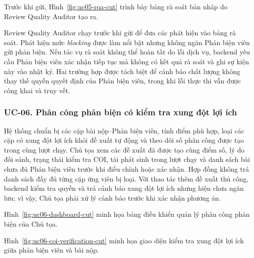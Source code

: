 Trước khi gửi, Hình~\ref{fig:uc05-rqa-cut} trình bày bảng rà soát bản nháp do Review Quality Auditor tạo ra.

Review Quality Auditor chạy trước khi gửi để đưa các phát hiện vào bảng rà soát. Phát hiện mức \textit{blocking} được làm nổi bật nhưng không ngăn Phản biện viên gửi phản biện. Nếu tác vụ rà soát không thể hoàn tất do lỗi dịch vụ, backend yêu cầu Phản biện viên xác nhận tiếp tục mà không có kết quả rà soát và ghi sự kiện này vào nhật ký. Hai trường hợp được tách biệt để cảnh báo chất lượng không thay thế quyền quyết định của Phản biện viên, trong khi lỗi thực thi vẫn được công khai và truy vết.

\subsubsection{UC-06. Phân công phản biện có kiểm tra xung đột lợi ích}

Hệ thống chuẩn bị các cặp bài nộp--Phản biện viên, tính điểm phù hợp, loại các cặp có xung đột lợi ích khỏi đề xuất tự động và theo dõi số phân công được tạo trong cùng lượt chạy. Chủ tọa xem các đề xuất đã được tạo cùng điểm số, lý do đối sánh, trạng thái kiểm tra COI, tải phát sinh trong lượt chạy và danh sách bài chưa đủ Phản biện viên trước khi điều chỉnh hoặc xác nhận. Hợp đồng  không trả danh sách đầy đủ từng cặp ứng viên bị loại. Với thao tác thêm đề xuất thủ công, backend kiểm tra quyền và trả cảnh báo xung đột lợi ích nhưng hiện chưa ngăn lưu; vì vậy, Chủ tọa phải xử lý cảnh báo trước khi xác nhận phương án.


Hình~\ref{fig:uc06-dashboard-cut} minh họa bảng điều khiển quản lý phân công phản biện của Chủ tọa.


Hình~\ref{fig:uc06-coi-verification-cut} minh họa giao diện kiểm tra xung đột lợi ích giữa phản biện viên và bài nộp.

